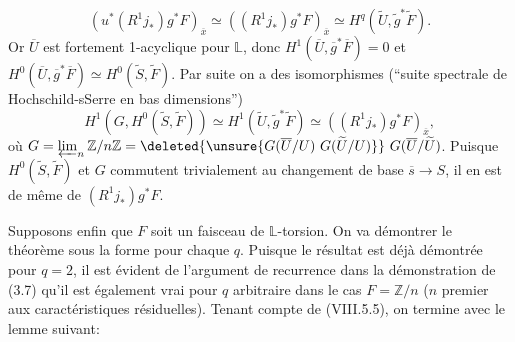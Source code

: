 \[
(u^*(R^1j_*)g^*F)_{\overline x}\simeq((R^1j_*)g^*F)_{\overline x}\simeq H^q(\widetilde U,\widetilde g^*\widetilde F).
\]
Or $\overline U$ est fortement 1-acyclique pour $\mathbb L$, donc $H^1(\overline U,\overline g^*\overline F)=0$ et $H^0(\overline U,\overline g^*\overline F)\simeq H^0(\widetilde S,\widetilde F)$. Par suite on a des isomorphismes (``suite spectrale de Hochschild-sSerre en bas dimensions'')
\[
H^1(G,H^0(\widetilde S,\widetilde F))\simeq H^1(\widetilde U,\widetilde g^*\widetilde F)\simeq((R^1j_*)g^*F)_{\overline x},
\]
où $G=\varprojlim_n\mathbb Z/n\mathbb Z=\deleted{\unsure{G(\overline U/U)\ G(\widetilde U/U)}}\ G(\overline U/\widetilde U)$. Puisque $H^0(\widetilde S,\widetilde F)$  et $G$ commutent trivialement au changement de base $\overline s\longrightarrow S$, il en est de même de $(R^1j_*)g^*F$.

Supposons enfin que $F$ soit un faisceau de  $\mathbb L$-torsion. On va démontrer le théorème sous la forme
\diagram{\[
\begin{tikzcd}
{u'}^*(R^qi^!)g^*F\arrow[r,"\sim"]&(R^q{i'}^!){g'}^*u^*F
\end{tikzcd}
\]}
pour chaque $q$. Puisque le résultat est déjà démontrée pour $q=2$, il est évident de l'argument de recurrence dans la démonstration de (3.7)  qu'il est  également vrai pour $q$ arbitraire dans le cas $F=\mathbb Z/n$ ($n$ premier aux caractéristiques résiduelles). Tenant compte de (VIII.5.5), on termine avec le lemme suivant:
